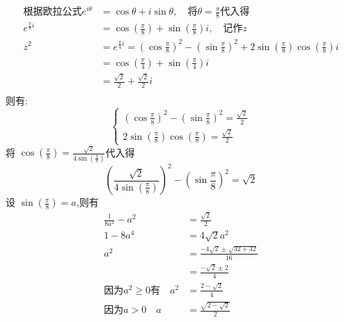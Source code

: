 \documentclass[answers]{exam}
\begin{document}
\begin{questions}
	\begin{solution}
		\begin{align*}
			\text{根据欧拉公式} e^{i\theta} & = \cos\theta + i\sin\theta,
			\quad\text{将}\theta = \frac{\pi}{8} \text{代入得}                                                   \\
			e^{\frac{\pi}{8}i}              & =
			\cos\left(\frac{\pi}{8}\right) + \sin\left(\frac{\pi}{8}\right)i,\quad \text{记作}z                  \\
			z^2                             & = e^{\frac{\pi}{4}i}
			= \left(\cos\frac{\pi}{8}\right)^2 - \left(\sin\frac{\pi}{8}\right)^2 +
			2\sin\left(\frac{\pi}{8}\right)\cos\left(\frac{\pi}{8}\right)i                                       \\
			                                & = \cos\left(\frac{\pi}{4}\right) + \sin\left(\frac{\pi}{4}\right)i \\
			                                & = \frac{\sqrt{2}}{2} + \frac{\sqrt{2}}{2}i                         \\
		\end{align*}
		则有:
		\begin{equation*}
			\begin{cases}
				\left(\cos\frac{\pi}{8}\right)^2 - \left(\sin\frac{\pi}{8}\right)^2  = \frac{\sqrt{2}}{2} \\
				2\sin\left(\frac{\pi}{8}\right)\cos\left(\frac{\pi}{8}\right) = \frac{\sqrt{2}}{2}
			\end{cases}
		\end{equation*}
		将 \(\displaystyle \cos\left(\frac{\pi}{8}\right) = \frac{\sqrt{2}}{4\sin\left(\frac{\pi}{8}\right)}\)代入得
		\[
			\left(\frac{\sqrt{2}}{4\sin\left(\frac{\pi}{8}\right)}\right)^2 - \left(\sin\frac{\pi}{8}\right)^2  = \sqrt{2}
		\]
		设 \( \sin\left(\frac{\pi}{8}\right) = a \),则有
		\begin{align*}
			\frac{1}{8a^2} - a^2 & = \frac{\sqrt{2}}{2}                       \\
			1 - 8a^4             & = 4\sqrt{2}a^2                             \\
			a^2                  & = \frac{-4\sqrt{2} \pm \sqrt{32 + 32}}{16} \\
			                     & = \frac{-\sqrt{2} \pm 2}{4}                \\
			\text{因为}a^2 \ge 0 \text{有}\quad
			a^2                  & = \frac{2-\sqrt{2}}{4}                     \\
			\text{因为} a > 0 \quad
			a                    & = \frac{\sqrt{2-\sqrt{2}}}{2}
		\end{align*}


\end{solution}
\end{questions}
\end{document}
